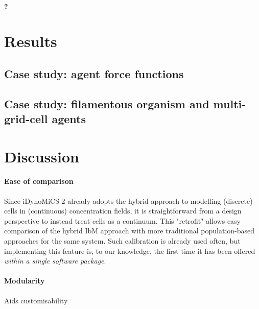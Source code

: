 \documentclass[10pt,letterpaper]{article}
\begin{document}
\paragraph{?}


\section*{Results}


\subsection*{Case study: agent force functions}

\subsection*{Case study: filamentous organism and multi-grid-cell agents}


\section*{Discussion}

\paragraph{Ease of comparison}
Since iDynoMiCS 2 already adopts the hybrid approach to modelling (discrete) cells in (continuous) concentration fields, it is straightforward from a design perspective to instead treat cells as a continuum. This "retrofit" allows easy comparison of the hybrid IbM approach with more traditional population-based approaches \cite{wanner1986}
for the same system. Such calibration is already used often,
but implementing this feature is, to our knowledge, the first time it has been offered \textit{within a single software package}.

\paragraph{Modularity}
Aids customisability
\end{document}
